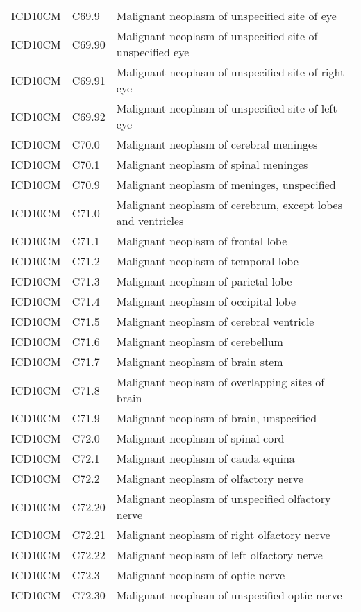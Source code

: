 \begin{longtable}{p{}p{}p{}}
  ICD10CM & C69.9 & Malignant neoplasm of unspecified site of eye \\ 
  ICD10CM & C69.90 & Malignant neoplasm of unspecified site of unspecified eye \\ 
  ICD10CM & C69.91 & Malignant neoplasm of unspecified site of right eye \\ 
  ICD10CM & C69.92 & Malignant neoplasm of unspecified site of left eye \\ 
  ICD10CM & C70.0 & Malignant neoplasm of cerebral meninges \\ 
  ICD10CM & C70.1 & Malignant neoplasm of spinal meninges \\ 
  ICD10CM & C70.9 & Malignant neoplasm of meninges, unspecified \\ 
  ICD10CM & C71.0 & Malignant neoplasm of cerebrum, except lobes and ventricles \\ 
  ICD10CM & C71.1 & Malignant neoplasm of frontal lobe \\ 
  ICD10CM & C71.2 & Malignant neoplasm of temporal lobe \\ 
  ICD10CM & C71.3 & Malignant neoplasm of parietal lobe \\ 
  ICD10CM & C71.4 & Malignant neoplasm of occipital lobe \\ 
  ICD10CM & C71.5 & Malignant neoplasm of cerebral ventricle \\ 
  ICD10CM & C71.6 & Malignant neoplasm of cerebellum \\ 
  ICD10CM & C71.7 & Malignant neoplasm of brain stem \\ 
  ICD10CM & C71.8 & Malignant neoplasm of overlapping sites of brain \\ 
  ICD10CM & C71.9 & Malignant neoplasm of brain, unspecified \\ 
  ICD10CM & C72.0 & Malignant neoplasm of spinal cord \\ 
  ICD10CM & C72.1 & Malignant neoplasm of cauda equina \\ 
  ICD10CM & C72.2 & Malignant neoplasm of olfactory nerve \\ 
  ICD10CM & C72.20 & Malignant neoplasm of unspecified olfactory nerve \\ 
  ICD10CM & C72.21 & Malignant neoplasm of right olfactory nerve \\ 
  ICD10CM & C72.22 & Malignant neoplasm of left olfactory nerve \\ 
  ICD10CM & C72.3 & Malignant neoplasm of optic nerve \\ 
  ICD10CM & C72.30 & Malignant neoplasm of unspecified optic nerve \\ 

\end{longtable}
